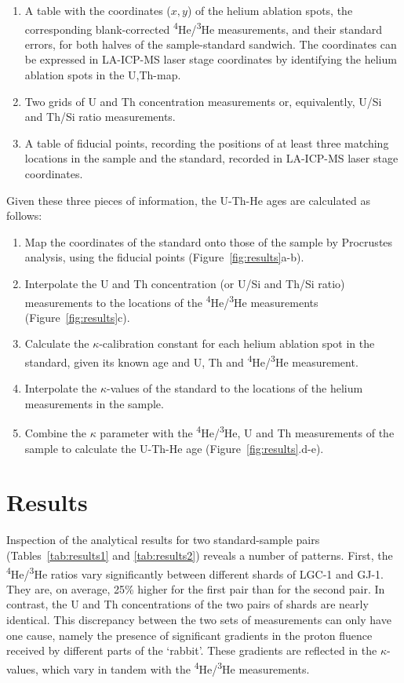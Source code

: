 \documentclass{article}
\begin{document}
\begin{enumerate}
\item A table with the coordinates ($x, y$) of the helium ablation
  spots, the corresponding blank-corrected
  \textsuperscript{4}He/\textsuperscript{3}He measurements, and their
  standard errors, for both halves of the sample-standard sandwich.
  The coordinates can be expressed in LA-ICP-MS laser stage
  coordinates by identifying the helium ablation spots in the
  U,Th-map.
\item Two grids of U and Th concentration measurements or,
  equivalently, U/Si and Th/Si ratio measurements.
\item A table of fiducial points, recording the positions of at least
  three matching locations in the sample and the standard, recorded in
  LA-ICP-MS laser stage coordinates.
\end{enumerate}

Given these three pieces of information, the U-Th-He ages are
calculated as follows:

\begin{enumerate}
\item Map the coordinates of the standard onto those of the sample by
  Procrustes analysis, using the fiducial points
  (Figure~\ref{fig:results}a-b).
\item Interpolate the U and Th concentration (or U/Si and Th/Si ratio)
  measurements to the locations of the
  \textsuperscript{4}He/\textsuperscript{3}He measurements
  (Figure~\ref{fig:results}c).
\item Calculate the $\kappa$-calibration constant for each helium
  ablation spot in the standard, given its known age and U, Th and
  \textsuperscript{4}He/\textsuperscript{3}He measurement.
\item Interpolate the $\kappa$-values of the standard to the locations
  of the helium measurements in the sample.
\item Combine the $\kappa$ parameter with the
  \textsuperscript{4}He/\textsuperscript{3}He, U and Th measurements
  of the sample to calculate the U-Th-He age
  (Figure~\ref{fig:results}.d-e).
\end{enumerate}

\section{Results}
\label{sec:results}

Inspection of the analytical results for two standard-sample pairs
(Tables~\ref{tab:results1} and \ref{tab:results2}) reveals a number of
patterns. First, the \textsuperscript{4}He/\textsuperscript{3}He
ratios vary significantly between different shards of LGC-1 and
GJ-1. They are, on average, 25\% higher for the first pair than for
the second pair. In contrast, the U and Th concentrations of the two
pairs of shards are nearly identical. This discrepancy between the two
sets of measurements can only have one cause, namely the presence of
significant gradients in the proton fluence received by different
parts of the `rabbit'. These gradients are reflected in the
$\kappa$-values, which vary in tandem with the
\textsuperscript{4}He/\textsuperscript{3}He measurements.\medskip
\end{document}
